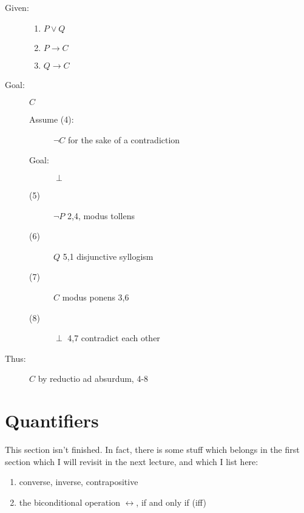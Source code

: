 \documentclass[12pt]{article}
\begin{document}
\begin{description}


\item[Given:]  
\begin{enumerate}
\item $P \vee Q$

\item $P \rightarrow C$

\item $Q \rightarrow C$

\end{enumerate}

\item[Goal:] $C$

\begin{description}
\item[Assume (4):]  $\neg C$  for the sake of a contradiction

\item[Goal:]  $\perp$

\item[(5)] $\neg P$ 2,4, modus tollens

\item[(6)]  $Q$ 5,1 disjunctive syllogism

\item[(7)]  $C$ modus ponens 3,6

\item[(8)]  $\perp$  4,7 contradict each other

\end{description}

\item[Thus:]  $C$ by reductio ad absurdum, 4-8

\end{description}

\section{Quantifiers}

This section isn't finished.  In fact, there is some stuff which belongs in the first section which I will revisit in the next lecture, and which I list here:

\begin{enumerate}

\item converse, inverse, contrapositive

\item the biconditional operation $\leftrightarrow$, if and only if (iff)

\end{enumerate}
\end{document}
